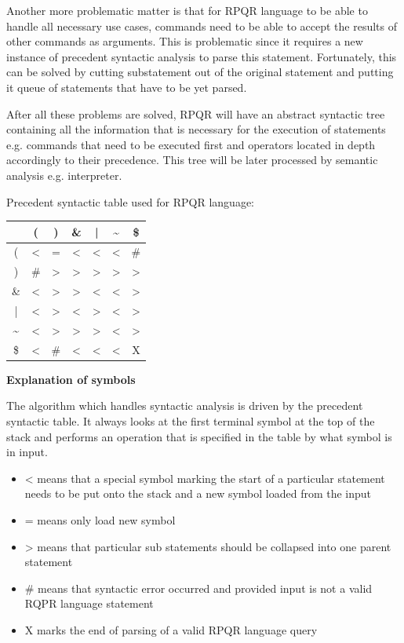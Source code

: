 Another more problematic matter is that for RPQR language to be able to handle all necessary use cases,
commands need to be able to accept the results of other commands as arguments. This is problematic since
it requires a new instance of precedent syntactic analysis to parse this statement. Fortunately, this
can be solved by cutting substatement out of the original statement and putting it queue of statements
that have to be yet parsed.

After all these problems are solved, RPQR will have an abstract syntactic tree containing all the information
that is necessary for the execution of statements e.g. commands that need to be executed first and operators
located in depth accordingly to their precedence. This tree will be later processed by semantic
analysis e.g. interpreter.

\newpage

Precedent syntactic table used for RPQR language:

\begin{center}
  \begin{tabular}{ |c|c|c|c|c|c|c| }
   \hline
     & ( & ) & \& & | & \textasciitilde & \$ \\
     \hline
  (  & < & = & <  & <  & <  & \#  \\
  \hline
  )  & \# & > & >  & >  & >  & >  \\  
  \hline
  \& & < & > & >  & <  & <  & >  \\
  \hline
  |  & < & > & <  & >  & <  & >  \\
  \hline
  \textasciitilde  & < & > & >  & >  & <  & >  \\
  \hline
  \$ & < & \# & <  & <  & <  & X \\
  \hline
  \end{tabular}
\end{center}

\textbf{Explanation of symbols}

The algorithm which handles syntactic analysis is driven by the precedent syntactic table. It always
looks at the first terminal symbol at the top of the stack and performs an operation that is specified
in the table by what symbol is in input.
\begin{itemize}
  \item < means that a special symbol marking the start of a particular statement needs to be put onto the stack and a new symbol loaded from the input
  \item = means only load new symbol
  \item > means that particular sub statements should be collapsed into one parent statement
  \item \# means that syntactic error occurred and provided input is not a valid RQPR language statement
  \item X marks the end of parsing of a valid RPQR language query
\end{itemize}

